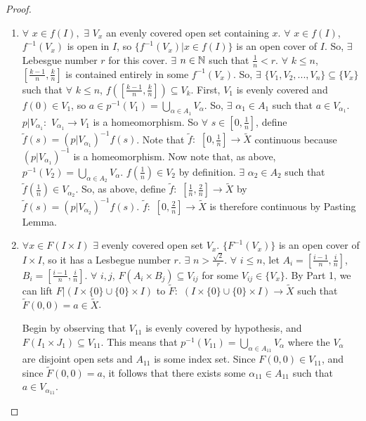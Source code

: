     \begin{proof}
    \begin{enumerate}
    \item $\forall$ $x \in f(I),$ $\exists$ $V_x$ an evenly covered open set containing $x$. $\forall$ $x \in f(I)$, $f^{-1}(V_x)$ is open in $I$, so $\{f^{-1}(V_x)|x \in f(I) \}$ is an open cover of $I$. So, $\exists$ Lebesgue number $r$ for this cover. $\exists$ $n \in \mathbb N$ such that $\tfrac{1}{n} < r$.  $\forall$ $k \leq n$, $[ \frac{k-1}{n}, \frac{k}{n}]$ is contained entirely in some $f^{-1}(V_x)$. So, $\exists$ $\{ V_1, V_2, ... , V_n \} \subseteq \{ V_x \}$ such that $\forall$ $k \leq n$, $f([ \frac{k-1}{n}, \frac{k}{n}]) \subseteq V_k$.
    First, $V_1$ is evenly covered and $f(0) \in V_1$, so $a \in p^{-1}(V_1) = \bigcup_{ \alpha \in A_1}V_{\alpha}$. So, $\exists$ $\alpha_1 \in A_1$ such that $a \in V_{\alpha_1}$. $p | V_{\alpha_1}\colon$ $V_{\alpha_1} \to V_1$ is a homeomorphism. So $\forall$ $s \in [0, \tfrac{1}{n}]$, define $\widetilde{f}(s) = (p | V_{\alpha_1})^{-1} f(s)$. Note that $\widetilde{f} \colon$ $[0, \tfrac{1}{n}] \to \widetilde{X}$ continuous because $(p | V_{\alpha_1})^{-1}$ is a homeomorphism.
    Now note that, as above, $p^{-1}(V_2) =  \bigcup_{ \alpha \in A_2}V_{\alpha}$. $f(\tfrac{1}{n}) \in V_2$ by definition. $\exists$ $\alpha_2 \in A_2$ such that $\widetilde{f}(\tfrac{1}{n}) \in V_{\alpha_2}$. So, as above, define $\widetilde{f} \colon$ $[\tfrac{1}{n}, \tfrac{2}{n}] \to \widetilde{X}$ by $\widetilde{f}(s) = (p | V_{\alpha_2})^{-1} f(s)$. $\widetilde{f} \colon$ $[0, \tfrac{2}{n}] \to \widetilde{X}$ is therefore continuous by Pasting Lemma.
    	
    
    \item  $\forall x \in F(I \times I)$ $\exists$ evenly covered open set $V_x$. $\{ F^{-1}(V_x) \}$ is an open cover of $I \times I$, so it has a Lesbegue number $r$. $\exists$ $n > \tfrac{\sqrt{2}}{r}$. $\forall$ $i \leq n$, let $A_i = [\tfrac{i-1}{n}, \tfrac{i}{n}]$, $B_i = [\tfrac{i-1}{n}, \tfrac{i}{n}]$. $\forall$ $i, j$, $F(A_i \times B_j) \subseteq V_{ij}$ for some $V_{ij} \in \{ V_x \}$. By Part 1, we can lift $F|(I \times \{ 0 \} \cup \{ 0 \} \times I)$ to $\widetilde{F} \colon$ $(I \times \{ 0 \} \cup \{ 0 \} \times I) \to \widetilde{X}$ such that $\widetilde{F}(0,0) = a \in \widetilde{X}$.

Begin by observing that $V_{11}$ is evenly covered by hypothesis, and $F(I_1\times J_1)\subseteq V_{11}$. This means that $p^{-1}(V_{11})=\bigcup_{\alpha \in A_{11}}V_\alpha$ where the $V_\alpha$ are disjoint open sets and $A_{11}$ is some index set. Since $F(0,0)\in V_{11}$, and since $\tilde{F}(0,0)=a$, it follows that there exists some $\alpha_{11}\in A_{11}$ such that $a\in V_{\alpha_ {11}}$.


\end{enumerate}
\end{proof}
